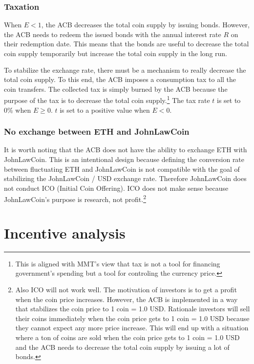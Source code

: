 \documentclass[dvipdfmx,a4paper]{article}
\begin{document}
\subsubsection{Taxation}

When $E<1$, the ACB decreases the total coin supply by issuing bonds. However, the ACB needs to redeem the issued bonds with the annual interest rate $R$ on their redemption date. This means that the bonds are useful to decrease the total coin supply temporarily but increase the total coin supply in the long run.

To stabilize the exchange rate, there must be a mechanism to really decrease the total coin supply. To this end, the ACB imposes a consumption tax to all the coin transfers. The collected tax is simply burned by the ACB because the purpose of the tax is to decrease the total coin supply.\footnote{This is aligned with MMT's view that tax is not a tool for financing government's spending but a tool for controling the currency price.} The tax rate $t$ is set to 0\% when $E\ge 0$. $t$ is set to a positive value when $E<0$.

\subsubsection{No exchange between ETH and JohnLawCoin}

It is worth noting that the ACB does not have the ability to exchange ETH with JohnLawCoin. This is an intentional design because defining the conversion rate between fluctuating ETH and JohnLawCoin is not compatible with the goal of stabilizing the JohnLawCoin / USD exchange rate. Therefore JohnLawCoin does not conduct ICO (Initial Coin Offering). ICO does not make sense because JohnLawCoin's purpose is research, not profit.\footnote{Also ICO will not work well. The motivation of investors is to get a profit when the coin price increases. However, the ACB is implemented in a way that stabilizes the coin price to 1 coin = 1.0 USD. Rationale investors will sell their coins immediately when the coin price gets to 1 coin = 1.0 USD because they cannot expect any more price increase. This will end up with a situation where a ton of coins are sold when the coin price gets to 1 coin = 1.0 USD and the ACB needs to decrease the total coin supply by issuing a lot of bonds.}

\section{Incentive analysis}
\end{document}
